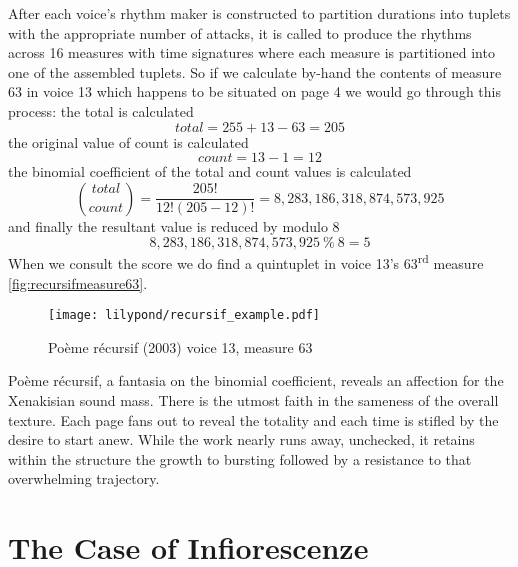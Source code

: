 After each voice's rhythm maker is constructed to partition durations into tuplets with the appropriate number of attacks, it is called to produce the rhythms across 16 measures with  time signatures where each measure is partitioned into one of the assembled tuplets. So if we calculate by-hand the contents of measure 63 in voice 13 which happens to be situated on page 4 we would go through this process: the total is calculated \begin{equation}total = 255 + 13 - 63 = 205\end{equation} the original value of count is calculated \begin{equation}count = 13 - 1 = 12\end{equation} the binomial coefficient of the total and count values is calculated \begin{equation}\binom{total}{count} = \frac{205!}{12!(205-12)!} = 8,283,186,318,874,573,925\end{equation} and finally the resultant value is reduced by modulo 8 \begin{equation}8,283,186,318,874,573,925 \ \% \ 8 = 5\end{equation} When we consult the score we do find a quintuplet in voice 13's 63\textsuperscript{rd} measure \autoref{fig:recursifmeasure63}.

\begin{figure}[H]
    \texttt{[image: lilypond/recursif\_example.pdf]}
    \caption{Po\`eme r\'ecursif (2003) voice 13, measure 63}
    \label{fig:recursifmeasure63}
\end{figure}

Po\`eme r\'ecursif, a fantasia on the binomial coefficient, reveals an affection for the Xenakisian sound mass. There is the utmost faith in the sameness of the overall texture. Each page fans out to reveal the totality and each time is stifled by the desire to start anew. While the work nearly runs away, unchecked, it retains within the structure the growth to bursting followed by a resistance to that overwhelming trajectory.

\section{The Case of Infiorescenze}

